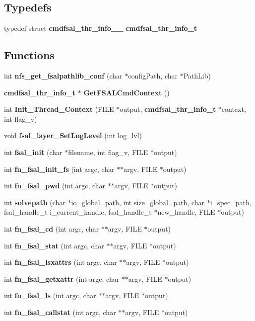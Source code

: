 \subsection*{Typedefs}
\begin{DoxyCompactItemize}
\item 
typedef struct {\bf cmdfsal\_\-thr\_\-info\_\-\_\-} {\bf cmdfsal\_\-thr\_\-info\_\-t}
\end{DoxyCompactItemize}
\subsection*{Functions}
\begin{DoxyCompactItemize}
\item 
int {\bf nfs\_\-get\_\-fsalpathlib\_\-conf} (char $\ast$configPath, char $\ast$PathLib)
\item 
{\bf cmdfsal\_\-thr\_\-info\_\-t} $\ast$ {\bf GetFSALCmdContext} ()
\item 
int {\bf Init\_\-Thread\_\-Context} (FILE $\ast$output, {\bf cmdfsal\_\-thr\_\-info\_\-t} $\ast$context, int flag\_\-v)
\item 
void {\bf fsal\_\-layer\_\-SetLogLevel} (int log\_\-lvl)
\item 
int {\bf fsal\_\-init} (char $\ast$filename, int flag\_\-v, FILE $\ast$output)
\item 
int {\bf fn\_\-fsal\_\-init\_\-fs} (int argc, char $\ast$$\ast$argv, FILE $\ast$output)
\item 
int {\bf fn\_\-fsal\_\-pwd} (int argc, char $\ast$$\ast$argv, FILE $\ast$output)
\item 
int {\bf solvepath} (char $\ast$io\_\-global\_\-path, int size\_\-global\_\-path, char $\ast$i\_\-spec\_\-path, fsal\_\-handle\_\-t i\_\-current\_\-handle, fsal\_\-handle\_\-t $\ast$new\_\-handle, FILE $\ast$output)
\item 
int {\bf fn\_\-fsal\_\-cd} (int argc, char $\ast$$\ast$argv, FILE $\ast$output)
\item 
int {\bf fn\_\-fsal\_\-stat} (int argc, char $\ast$$\ast$argv, FILE $\ast$output)
\item 
int {\bf fn\_\-fsal\_\-lsxattrs} (int argc, char $\ast$$\ast$argv, FILE $\ast$output)
\item 
int {\bf fn\_\-fsal\_\-getxattr} (int argc, char $\ast$$\ast$argv, FILE $\ast$output)
\item 
int {\bf fn\_\-fsal\_\-ls} (int argc, char $\ast$$\ast$argv, FILE $\ast$output)
\item 
int {\bf fn\_\-fsal\_\-callstat} (int argc, char $\ast$$\ast$argv, FILE $\ast$output)

\end{DoxyCompactItemize}
